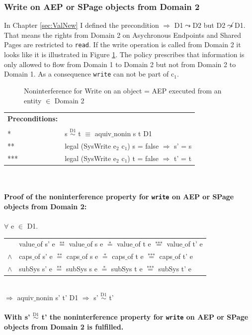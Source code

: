 \documentclass[11pt,a4paper,twoside]{article}
\begin{document}
{\subsubsection{Write on AEP or SPage objects from Domain 2}\label{WriteOut}
In Chapter \ref{sec:ValNew} I defined the precondition $\Rightarrow$ D1$\leadsto$D2 but D2$\not\leadsto$D1. That means the rights from Domain 2 on Asychronous Endpoints and Shared Pages are restricted to \texttt{read}. 
If the write operation is called from Domain 2 it looks like it is illustrated in Figure \ref{fig:WriteOut1}. The policy prescribes that information is only allowed to flow from Domain 1 to Domain 2 but not from Domain 2 to Domain 1. As a consequence \texttt{write} can not be part of c$_1$. 
\begin{flushleft}
\begin{figure}[H]
\caption{Noninterference for Write on an object = AEP executed from an entity $\in$ Domain 2}
\label{fig:WriteOut1}
\end{figure}
\end{flushleft}
\begin{tabular}{ll}
\textbf{Preconditions:} \\ \\
* & s $\overset{\text{D1}}{\sim}$ t $\equiv$ aquiv$\_$nonin s t D1	\\ 
** & legal (SysWrite e$_2$ c$_1$) s = false $\Rightarrow$ s' = s \\ 
*** & legal (SysWrite e$_2$ c$_1$) t = false $\Rightarrow$ t' = t
\end{tabular} \\ \\ 
\textbf{Proof of the noninterference property for \texttt{write} on AEP or SPage objects from Domain 2:}\\ \\
$\forall$ e $\in$ D1. \\ 
\begin{tabular}{ll}
& value$\_$of s' e $\overset{\text{**}}{=}$ value$\_$of s e $\overset{\text{*}}{=}$ value$\_$of t e $\overset{\text{***}}{=}$ value$\_$of t' e \\
$\wedge$ & caps$\_$of s' e $\overset{\text{**}}{=}$ caps$\_$of s e $\overset{\text{*}}{=}$ caps$\_$of t e $\overset{\text{***}}{=}$ caps$\_$of t' e \\
$\wedge$ & subSys s' e $\overset{\text{**}}{=}$ subSys s e $\overset{\text{*}}{=}$ subSys t e $\overset{\text{***}}{=}$ subSys t' e
\end{tabular} \\
$\Rightarrow$ aquiv$\_$nonin s' t' D1 $\Rightarrow$ s' $\overset{\text{D1}}{\sim}$ t' \\ \\
\textbf{With s' $\overset{\text{D1}}{\sim}$ t' the noninterference property for \texttt{write} on AEP or SPage objects from Domain 2 is fulfilled.}  
\clearpage
}
\end{document}
